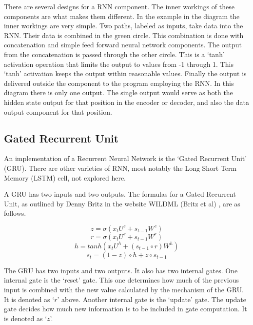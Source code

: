 There are several designs for a RNN component. The inner workings of these components are what makes them different. In the example in the diagram the inner workings are very simple. Two paths, labeled as inputs, take data into the RNN. Their data is combined in the green circle. This combination is done with concatenation and simple feed forward neural network components. The output from the concatenation is passed through the other circle. This is a `tanh' activation operation that limits the output to values from -1 through 1. This `tanh' activation keeps the output within reasonable values. Finally the output is delivered outside the component to the program employing the RNN. In this diagram there is only one output. The single output would serve as both the hidden state output for that position in the encoder or decoder, and also the data output component for that position.



\subsection{Gated Recurrent Unit}
An implementation of a Recurrent Neural Network is the `Gated Recurrent Unit' (GRU). There are other varieties of RNN, most notably the Long Short Term Memory (LSTM) cell, not explored here. %

A \ac{GRU} has two inputs and two outputs. The formulas for a Gated Recurrent Unit, as outlined by Denny Britz in the website WILDML (Britz et al) \cite{2015Britz}, are as follows.

\begin{minipage}{5in}

$$ z =\sigma(x_tU^z + s_{t-1} W^z) $$  
$$ r =\sigma(x_t U^r +s_{t-1} W^r) $$  
$$ h = tanh(x_t U^h + (s_{t-1} \circ r) W^h) $$  
$$ s_t = (1 - z) \circ h + z \circ s_{t-1} $$  

\end{minipage}

\bigskip \bigskip

The GRU has two inputs and two outputs. It also has two internal gates. One internal gate is the `reset' gate. This one determines how much of the previous input is combined with the new value calculated by the mechanism of the GRU. It is denoted as `$r$' above. Another internal gate is the `update' gate. The update gate decides how much new information is to be included in gate computation. It is denoted as `$z$'.

